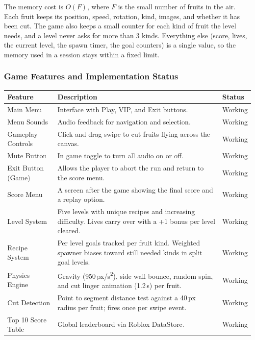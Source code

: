 \documentclass[12pt,letterpaper]{article}
\begin{document}
The memory cost is $O(F)$, where $F$ is the small number of fruits in the air. Each fruit keeps its position, speed, rotation, kind, images, and whether it has been cut. The game also keeps a small counter for each kind of fruit the level needs, and a level never asks for more than 3 kinds. Everything else (score, lives, the current level, the spawn timer, the goal counters) is a single value, so the memory used in a session stays within a fixed limit.

\subsubsection{Game Features and Implementation Status}

\begin{table}[H]
\centering
\begin{tabular}{|p{4cm}|p{8cm}|p{2.5cm}|}
\hline
\textbf{Feature} & \textbf{Description} & \textbf{Status} \\
\hline
Main Menu & Interface with Play, VIP, and Exit buttons. & Working \\
\hline
Menu Sounds & Audio feedback for navigation and selection. & Working \\
\hline
Gameplay Controls & Click and drag swipe to cut fruits flying across the canvas. & Working \\
\hline
Mute Button & In game toggle to turn all audio on or off. & Working \\
\hline
Exit Button (Game) & Allows the player to abort the run and return to the score menu. & Working \\
\hline
Score Menu & A screen after the game showing the final score and a replay option. & Working \\
\hline
Level System & Five levels with unique recipes and increasing difficulty. Lives carry over with a +1 bonus per level cleared. & Working \\
\hline
Recipe System & Per level goals tracked per fruit kind. Weighted spawner biases toward still needed kinds in split goal levels. & Working \\
\hline
Physics Engine & Gravity (950\,px/s\textsuperscript{2}), side wall bounce, random spin, and cut linger animation (1.2\,s) per fruit. & Working \\
\hline
Cut Detection & Point to segment distance test against a 40\,px radius per fruit; fires once per swipe event. & Working \\
\hline
Top 10 Score Table & Global leaderboard via Roblox DataStore. & Working \\

\end{tabular}
\end{table}
\end{document}
